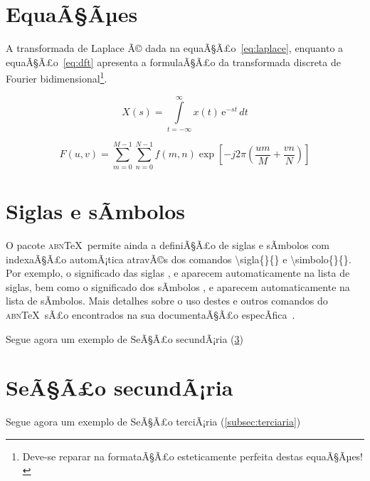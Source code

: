 \documentclass[openright]{normas-utf-tex} %
\begin{document}
\section{EquaÃ§Ãµes}
\label{sec:equacoes}

A transformada de Laplace Ã© dada na equaÃ§Ã£o~\eqref{eq:laplace}, enquanto a equaÃ§Ã£o~\eqref{eq:dft} apresenta a formulaÃ§Ã£o da transformada discreta de Fourier bidimensional\footnote{Deve-se reparar na formataÃ§Ã£o esteticamente perfeita destas equaÃ§Ãµes!}.

\begin{equation}
X(s) = \int\limits_{t = -\infty}^{\infty} x(t) \, \text{e}^{-st} \, dt
\label{eq:laplace}
\end{equation}

\begin{equation}
F(u, v) = \sum_{m = 0}^{M - 1} \sum_{n = 0}^{N - 1} f(m, n) \exp \left[ -j 2 \pi \left( \frac{u m}{M} + \frac{v n}{N} \right) \right]
\label{eq:dft}
\end{equation}

\section{Siglas e sÃ­mbolos}
\label{sec:siglasSimbolos}

O pacote \textsc{abn}\TeX\ permite ainda a definiÃ§Ã£o de siglas e sÃ­mbolos com indexaÃ§Ã£o automÃ¡tica atravÃ©s dos comandos {\ttfamily \textbackslash sigla\{\}\{\}} e {\ttfamily \textbackslash simbolo\{\}\{\}}. Por exemplo, o significado das siglas ,  e  aparecem automaticamente na lista de siglas, bem como o significado dos sÃ­mbolos ,  e  aparecem automaticamente na lista de sÃ­mbolos. Mais detalhes sobre o uso destes e outros comandos do \textsc{abn}\TeX\ sÃ£o encontrados na sua documentaÃ§Ã£o especÃ­fica~\cite{abnTeX2009}.

Segue agora um exemplo de SeÃ§Ã£o secundÃ¡ria (\ref{sec:secundaria})

\section{SeÃ§Ã£o secundÃ¡ria}
\label{sec:secundaria}

Segue agora um exemplo de SeÃ§Ã£o terciÃ¡ria (\ref{subsec:terciaria})
\end{document}
